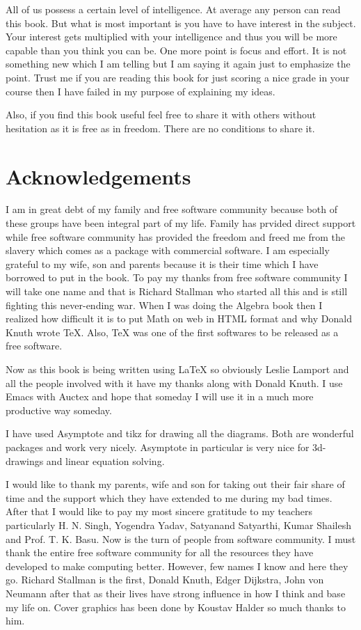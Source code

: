 All of us possess a certain level of intelligence. At average any person can read this book. But what is most important is you have
to have interest in the subject. Your interest gets multiplied with your intelligence and thus you will be more capable than you
think you can be. One more point is focus and effort. It is not something new which I am telling but I am saying it again just to
emphasize the point. Trust me if you are reading this book for just scoring a nice grade in your course then I have failed in my
purpose of explaining my ideas.

Also, if you find this book useful feel free to share it with others without hesitation as it is free as in freedom. There are no
conditions to share it.

\section*{Acknowledgements}
I am in great debt of my family and free software community because both of
these groups have been integral part of my life. Family has prvided direct
support while free software community has provided the freedom and freed me
from the slavery which comes as a package with commercial software. I am
especially grateful to my wife, son and parents because it is their time which
I have borrowed to put in the book. To pay my thanks from free software
community  I will take one name and that is Richard Stallman who started all
this  and is still fighting this never-ending war. When I was doing the Algebra
book then I realized how difficult it is to put Math on web in HTML format and
why Donald Knuth wrote \TeX{}. Also, \TeX{} was one of the first softwares to
be released as a free software.

Now as this book is being written using \LaTeX{} so obviously Leslie Lamport
and all the people involved with it have my thanks along with Donald Knuth. I
use Emacs with Auctex and hope that someday I will use it in a much more
productive way someday.

I have used Asymptote and tikz for drawing all the diagrams. Both are wonderful
packages and work very nicely. Asymptote in particular is very nice for 3d-drawings and linear equation solving.

I would like to thank my parents, wife and son for taking out their fair share
of time and the support which they have extended to me during my bad
times. After that I would like to pay my most sincere gratitude to my teachers
particularly H. N. Singh, Yogendra Yadav, Satyanand Satyarthi, Kumar Shailesh
and Prof. T. K. Basu. Now is the turn of people from software community. I must
thank the entire free software community for all the resources they have
developed to make computing better. However, few names I know and here they
go. Richard Stallman is the first, Donald Knuth, Edger Dijkstra, John von Neumann after that as their lives have strong influence in
how I think and base my life on. Cover graphics has been done by Koustav Halder so much thanks to him.

